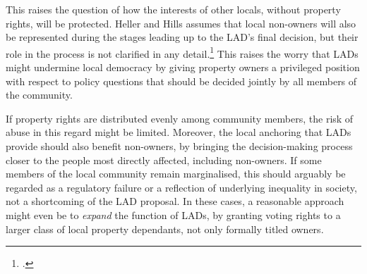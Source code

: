 This raises the question of how the interests of other locals, without property rights, will be protected. Heller and Hills assumes that local non-owners will also be represented during the stages leading up to the LAD's final decision, but their role in the process is not clarified in any detail.\footcite[1490-1491]{heller08} This raises the worry that LADs might undermine local democracy by giving property owners a privileged position with respect to policy questions that should be decided jointly by all members of the community. 

If property rights are distributed evenly among community members, the risk of abuse in this regard might be limited. Moreover, the local anchoring that LADs provide should also benefit non-owners, by bringing the decision-making process closer to the people most directly affected, including non-owners. If some members of the local community remain marginalised, this should arguably be regarded as a regulatory failure or a reflection of underlying inequality in society, not a shortcoming of the LAD proposal. In these cases, a reasonable approach might even be to {\it expand} the function of LADs, by granting voting rights to a larger class of local property dependants, not only formally titled owners.%


